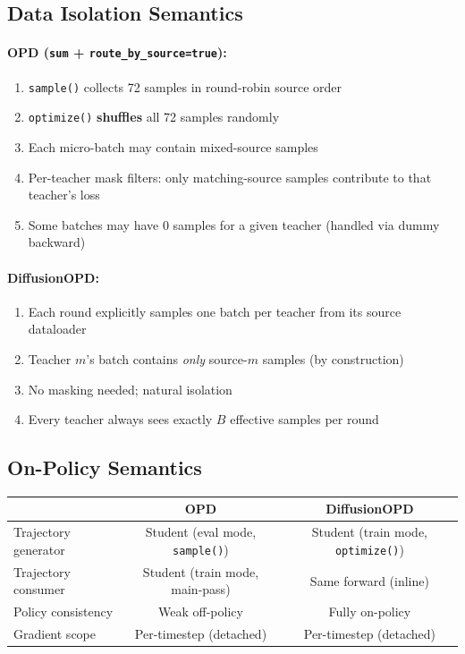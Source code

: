 \documentclass[11pt]{article}
\begin{document}
\subsection{Data Isolation Semantics}

\paragraph{OPD (\texttt{sum} + \texttt{route\_by\_source=true}):}
\begin{enumerate}[nosep]
    \item \texttt{sample()} collects 72 samples in round-robin source order
    \item \texttt{optimize()} \textbf{shuffles} all 72 samples randomly
    \item Each micro-batch may contain mixed-source samples
    \item Per-teacher mask filters: only matching-source samples contribute to that teacher's loss
    \item Some batches may have 0 samples for a given teacher (handled via dummy backward)
\end{enumerate}

\paragraph{DiffusionOPD:}
\begin{enumerate}[nosep]
    \item Each round explicitly samples one batch per teacher from its source dataloader
    \item Teacher $m$'s batch contains \emph{only} source-$m$ samples (by construction)
    \item No masking needed; natural isolation
    \item Every teacher always sees exactly $B$ effective samples per round
\end{enumerate}

\subsection{On-Policy Semantics}

\begin{table}[h]
\centering
\begin{tabular}{lcc}
\toprule
 & OPD & DiffusionOPD \\
\midrule
Trajectory generator & Student (eval mode, \texttt{sample()}) & Student (train mode, \texttt{optimize()}) \\
Trajectory consumer & Student (train mode, main-pass) & Same forward (inline) \\
Policy consistency & Weak off-policy\footnotemark & Fully on-policy \\
Gradient scope & Per-timestep (detached) & Per-timestep (detached) \\
\bottomrule
\end{tabular}
\end{table}
\end{document}
